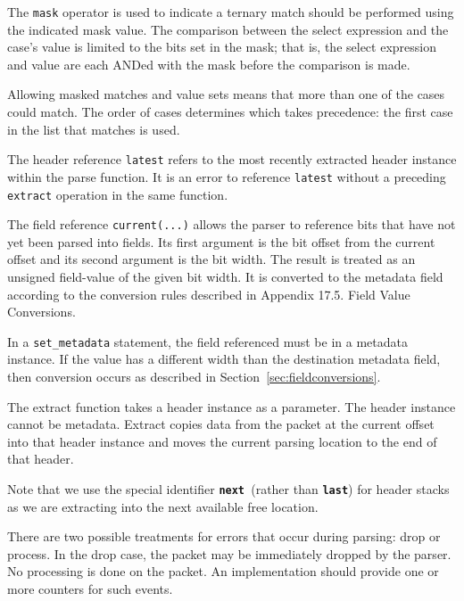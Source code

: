 \documentclass[12pt]{article}
\begin{document}
The \texttt{mask} operator is used to indicate a ternary match should be performed
using the indicated mask value. The comparison between the select expression
and the case's value is limited to the bits set in the mask; that is, the
select expression and value are each ANDed with the mask before the comparison
is made.

Allowing masked matches and value sets means that more than one of the cases
could match. The order of cases determines which takes precedence: the first
case in the list that matches is used.

The header reference \texttt{latest} refers to the most recently extracted header
instance within the parse function.  It is an error to reference \texttt{latest} without
a preceding \texttt{extract} operation in the same function.

The field reference \texttt{current(...)} allows the parser to reference bits that
have not yet been parsed into fields. Its first argument is the bit offset
from the current offset and its second argument is the bit width.  The result
is treated as an unsigned field-value of the given bit width. It is converted
to the metadata field according to the conversion rules described in Appendix
17.5. Field Value Conversions.

In a \texttt{set_metadata} statement, the field referenced must be in a metadata
instance. If the value has a different width than the destination metadata
field, then conversion occurs as described in Section~\ref{sec:fieldconversions}.


The extract function takes a header instance as a parameter.  The header instance
cannot be metadata. Extract copies data from the packet at the current offset
into that header instance and moves the current parsing location to the end
of that header.

Note that we use the special identifier \texttt{\textbf{next} }(rather than \texttt{\textbf{last}}) for header
stacks as we are extracting into the next available free location.


There are two possible treatments for errors that occur during parsing: drop
or process. In the drop case, the packet may be immediately dropped by the
parser. No \matchaction processing is done on the packet. An implementation
should provide one or more counters for such events.
\end{document}
